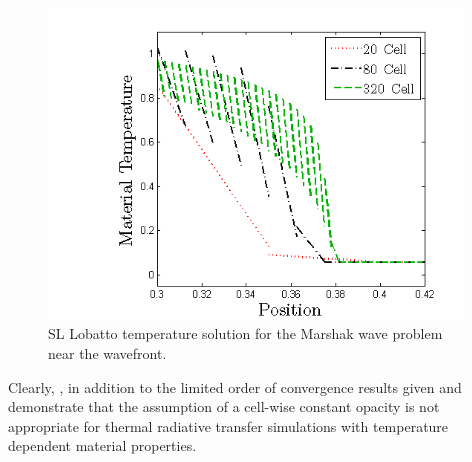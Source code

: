 %
%
\begin{figure}[!htp]
\centering
\includegraphics[width=11cm]{chapter6_grey_radtran/Dissertation_Data/Blading_Temperature_Zoom_MultiCell.png}
\caption{SL Lobatto temperature solution for the Marshak wave problem near the wavefront.}
\label{fig:bladed_t_profile_zoom}
\end{figure}
Clearly, , in addition to the limited order of convergence results given  and  demonstrate that the assumption of a cell-wise constant opacity is not appropriate for thermal radiative transfer simulations with temperature dependent material properties.
%

